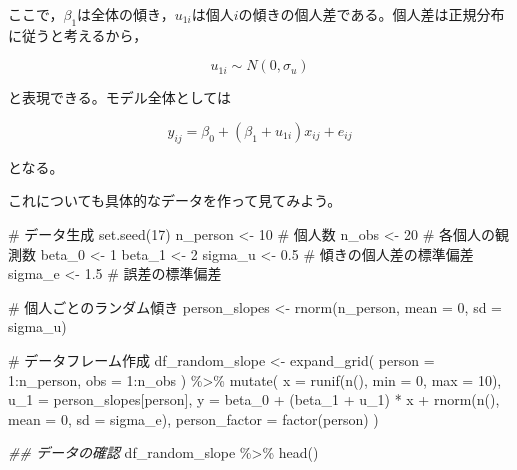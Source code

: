 \documentclass[
  a4paper,
]{ltjsbook}
\newenvironment{Shaded}{\begin{snugshade}}{\end{snugshade}}
\newcommand{\AttributeTok}[1]{\textcolor[rgb]{0.40,0.45,0.13}{#1}}
\newcommand{\CommentTok}[1]{\textcolor[rgb]{0.37,0.37,0.37}{#1}}
\newcommand{\DecValTok}[1]{\textcolor[rgb]{0.68,0.00,0.00}{#1}}
\newcommand{\DocumentationTok}[1]{\textcolor[rgb]{0.37,0.37,0.37}{\textit{#1}}}
\newcommand{\FloatTok}[1]{\textcolor[rgb]{0.68,0.00,0.00}{#1}}
\newcommand{\FunctionTok}[1]{\textcolor[rgb]{0.28,0.35,0.67}{#1}}
\newcommand{\NormalTok}[1]{\textcolor[rgb]{0.00,0.23,0.31}{#1}}
\newcommand{\OtherTok}[1]{\textcolor[rgb]{0.00,0.23,0.31}{#1}}
\newcommand{\SpecialCharTok}[1]{\textcolor[rgb]{0.37,0.37,0.37}{#1}}
\begin{document}
ここで，\(\beta_1\)は全体の傾き，\(u_{1i}\)は個人\(i\)の傾きの個人差である。個人差は正規分布に従うと考えるから，

\[
u_{1i} \sim N(0, \sigma_u)
\]

と表現できる。モデル全体としては

\[
y_{ij} = \beta_0  + (\beta_1 + u_{1i}) x_{ij} + e_{ij}
\]

となる。

これについても具体的なデータを作って見てみよう。

\begin{Shaded}
\begin{Highlighting}[]
\CommentTok{\# データ生成}
\FunctionTok{set.seed}\NormalTok{(}\DecValTok{17}\NormalTok{)}
\NormalTok{n\_person }\OtherTok{\textless{}{-}} \DecValTok{10}  \CommentTok{\# 個人数}
\NormalTok{n\_obs }\OtherTok{\textless{}{-}} \DecValTok{20}     \CommentTok{\# 各個人の観測数}
\NormalTok{beta\_0 }\OtherTok{\textless{}{-}} \DecValTok{1}
\NormalTok{beta\_1 }\OtherTok{\textless{}{-}} \DecValTok{2}
\NormalTok{sigma\_u }\OtherTok{\textless{}{-}} \FloatTok{0.5}  \CommentTok{\# 傾きの個人差の標準偏差}
\NormalTok{sigma\_e }\OtherTok{\textless{}{-}} \FloatTok{1.5}  \CommentTok{\# 誤差の標準偏差}

\CommentTok{\# 個人ごとのランダム傾き}
\NormalTok{person\_slopes }\OtherTok{\textless{}{-}} \FunctionTok{rnorm}\NormalTok{(n\_person, }\AttributeTok{mean =} \DecValTok{0}\NormalTok{, }\AttributeTok{sd =}\NormalTok{ sigma\_u)}

\CommentTok{\# データフレーム作成}
\NormalTok{df\_random\_slope }\OtherTok{\textless{}{-}} \FunctionTok{expand\_grid}\NormalTok{(}
  \AttributeTok{person =} \DecValTok{1}\SpecialCharTok{:}\NormalTok{n\_person,}
  \AttributeTok{obs =} \DecValTok{1}\SpecialCharTok{:}\NormalTok{n\_obs}
\NormalTok{) }\SpecialCharTok{\%\textgreater{}\%}
  \FunctionTok{mutate}\NormalTok{(}
    \AttributeTok{x =} \FunctionTok{runif}\NormalTok{(}\FunctionTok{n}\NormalTok{(), }\AttributeTok{min =} \DecValTok{0}\NormalTok{, }\AttributeTok{max =} \DecValTok{10}\NormalTok{),}
    \AttributeTok{u\_1 =}\NormalTok{ person\_slopes[person],}
    \AttributeTok{y =}\NormalTok{ beta\_0 }\SpecialCharTok{+}\NormalTok{ (beta\_1 }\SpecialCharTok{+}\NormalTok{ u\_1) }\SpecialCharTok{*}\NormalTok{ x }\SpecialCharTok{+} \FunctionTok{rnorm}\NormalTok{(}\FunctionTok{n}\NormalTok{(), }\AttributeTok{mean =} \DecValTok{0}\NormalTok{, }\AttributeTok{sd =}\NormalTok{ sigma\_e),}
    \AttributeTok{person\_factor =} \FunctionTok{factor}\NormalTok{(person)}
\NormalTok{  )}

\DocumentationTok{\#\# データの確認}
\NormalTok{df\_random\_slope }\SpecialCharTok{\%\textgreater{}\%} \FunctionTok{head}\NormalTok{()}
\end{Highlighting}
\end{Shaded}
\end{document}
